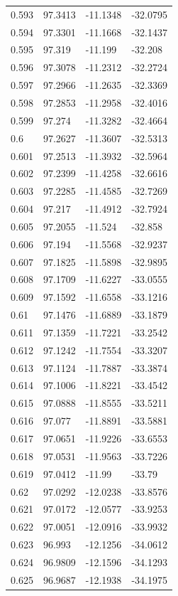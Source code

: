\begin{tabular}{llll}
0.593 & 97.3413 & -11.1348 & -32.0795 \\
0.594 & 97.3301 & -11.1668 & -32.1437 \\
0.595 & 97.319 & -11.199 & -32.208 \\
0.596 & 97.3078 & -11.2312 & -32.2724 \\
0.597 & 97.2966 & -11.2635 & -32.3369 \\
0.598 & 97.2853 & -11.2958 & -32.4016 \\
0.599 & 97.274 & -11.3282 & -32.4664 \\
0.6 & 97.2627 & -11.3607 & -32.5313 \\
0.601 & 97.2513 & -11.3932 & -32.5964 \\
0.602 & 97.2399 & -11.4258 & -32.6616 \\
0.603 & 97.2285 & -11.4585 & -32.7269 \\
0.604 & 97.217 & -11.4912 & -32.7924 \\
0.605 & 97.2055 & -11.524 & -32.858 \\
0.606 & 97.194 & -11.5568 & -32.9237 \\
0.607 & 97.1825 & -11.5898 & -32.9895 \\
0.608 & 97.1709 & -11.6227 & -33.0555 \\
0.609 & 97.1592 & -11.6558 & -33.1216 \\
0.61 & 97.1476 & -11.6889 & -33.1879 \\
0.611 & 97.1359 & -11.7221 & -33.2542 \\
0.612 & 97.1242 & -11.7554 & -33.3207 \\
0.613 & 97.1124 & -11.7887 & -33.3874 \\
0.614 & 97.1006 & -11.8221 & -33.4542 \\
0.615 & 97.0888 & -11.8555 & -33.5211 \\
0.616 & 97.077 & -11.8891 & -33.5881 \\
0.617 & 97.0651 & -11.9226 & -33.6553 \\
0.618 & 97.0531 & -11.9563 & -33.7226 \\
0.619 & 97.0412 & -11.99 & -33.79 \\
0.62 & 97.0292 & -12.0238 & -33.8576 \\
0.621 & 97.0172 & -12.0577 & -33.9253 \\
0.622 & 97.0051 & -12.0916 & -33.9932 \\
0.623 & 96.993 & -12.1256 & -34.0612 \\
0.624 & 96.9809 & -12.1596 & -34.1293 \\
0.625 & 96.9687 & -12.1938 & -34.1975 \\

\end{tabular}
